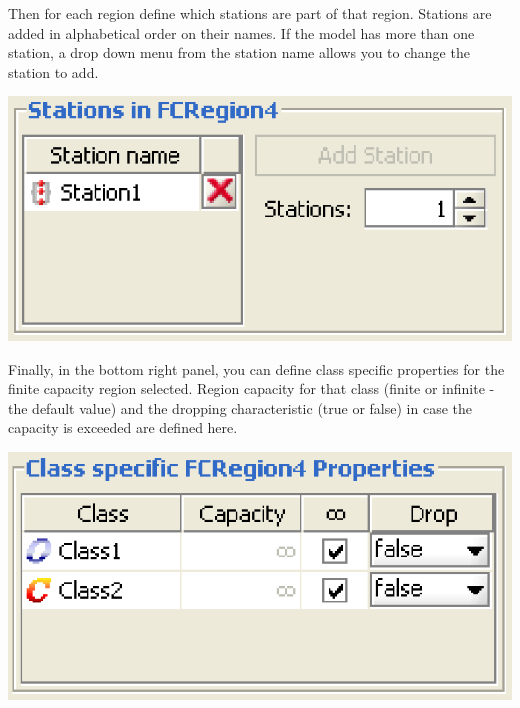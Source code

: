 \begin{description*}
\begin{center}
\end{center}
Then for each region define which stations are part of that region. Stations are added in alphabetical order on their names. If the model has more than one station, a drop down menu from the station name allows you to change the station to add.
\begin{center}
\includegraphics[scale=.5]{img/jsim/station_selection.eps}
\end{center}
Finally, in the bottom right panel, you can define class specific properties for the finite capacity region selected. Region capacity for that class (finite or infinite -the default value) and the dropping characteristic (true or false) in case the capacity is exceeded are defined here.
\begin{center}
\includegraphics[scale=.5]{img/jsim/class_selection.eps}
\end{center}


\end{description*}
